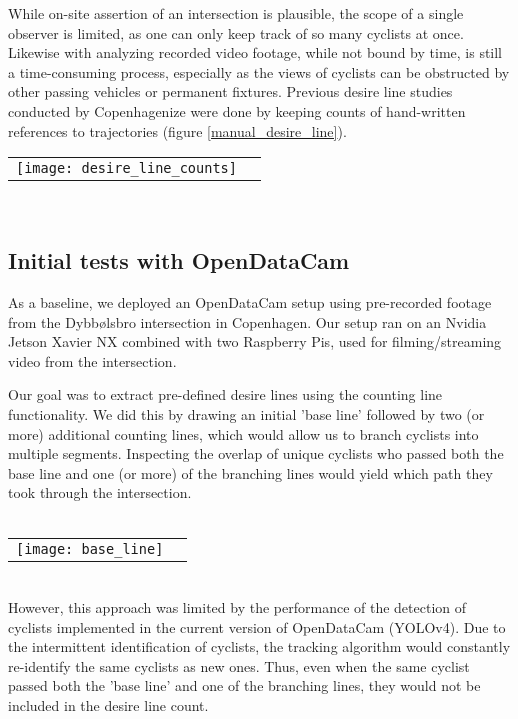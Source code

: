 While on-site assertion of an intersection is plausible, the scope of a single observer is limited, as one can only keep track of 
so many cyclists at once. Likewise with analyzing recorded video footage, while not bound by time, is still a time-consuming process, 
especially as the views of cyclists can be obstructed by other passing vehicles or permanent fixtures. Previous desire line 
studies conducted by Copenhagenize were done by keeping counts of hand-written references to trajectories (figure \ref{manual_desire_line}).
\ \\

\raggedbottom
\noindent
\begin{tabular}{@{}cc}
\texttt{[image: desire\_line\_counts]} 
\end{tabular}
\label{manual_desire_line}
\

\subsection{Initial tests with OpenDataCam}
As a baseline, we deployed an OpenDataCam setup using pre-recorded footage from the Dybbølsbro intersection in Copenhagen.
Our setup ran on an Nvidia Jetson Xavier NX combined with two Raspberry Pis, used for filming/streaming video from the intersection.

Our goal was to extract pre-defined desire lines using the counting line functionality. We did this by drawing an initial 
'base line' followed by two (or more) additional counting lines, which would allow us to branch cyclists into multiple segments. Inspecting the
overlap of unique cyclists who passed both the base line and one (or more) of the branching lines would yield which path
they took through the intersection. 
\ \\

\ \\
\raggedbottom
\noindent
\begin{tabular}{@{}cc}
\texttt{[image: base\_line]} 
\end{tabular}
\ \\

However, this approach was limited by the performance of the detection of cyclists implemented in the current 
version of OpenDataCam (YOLOv4). Due to the intermittent identification of cyclists, the tracking algorithm would constantly 
re-identify the same cyclists as new ones. Thus, even when the same cyclist passed both the 'base line' and one of the 
branching lines, they would not be included in the desire line count.
\ \\
 
